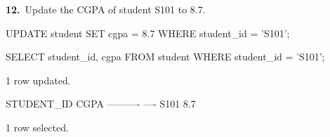 \noindent\begin{minipage}{\linewidth}
\begingroup{}
{\fontsize{14}{17}\selectfont\textbf{12.}}\ Update the CGPA of student S101 to 8.7.\par
\endgroup\vspace{12pt}


\begin{sqlcode}
UPDATE student SET cgpa = 8.7 WHERE student_id = 'S101';

SELECT student_id, cgpa FROM student WHERE student_id = 'S101';
\end{sqlcode}

\vspace{18pt}


\begin{sqlout}[fontsize=\small]
1 row updated.

STUDENT_ID  CGPA
----------  ----
S101         8.7

1 row selected.
\end{sqlout}
\end{minipage}\par\vspace{24pt}

